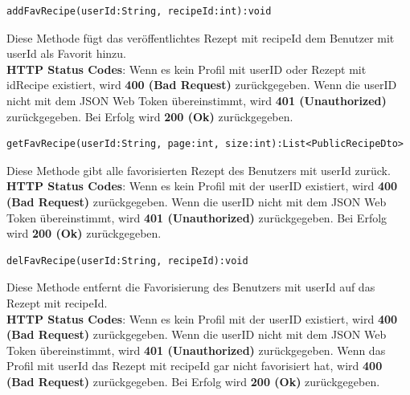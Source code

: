 \vspace{1cm}  
 \begin{lstlisting}
addFavRecipe(userId:String, recipeId:int):void
\end{lstlisting}
Diese Methode fügt das veröffentlichtes Rezept mit recipeId dem Benutzer mit userId als Favorit hinzu.\\
\textbf{HTTP Status Codes}:
Wenn es kein Profil mit userID oder Rezept mit idRecipe existiert, wird \textbf{400 (Bad Request)} zurückgegeben. Wenn die userID nicht mit dem JSON Web Token übereinstimmt, wird \textbf{401 (Unauthorized)} zurückgegeben. Bei Erfolg wird \textbf{200 (Ok)} zurückgegeben.
\vspace{1cm}
 \begin{lstlisting}
getFavRecipe(userId:String, page:int, size:int):List<PublicRecipeDto>
\end{lstlisting}
Diese Methode gibt alle favorisierten Rezept des Benutzers mit userId zurück.\\
\textbf{HTTP Status Codes}:
Wenn es kein Profil mit der userID existiert, wird \textbf{400 (Bad Request)} zurückgegeben. Wenn die userID nicht mit dem JSON Web Token übereinstimmt, wird \textbf{401 (Unauthorized)} zurückgegeben. Bei Erfolg wird \textbf{200 (Ok)} zurückgegeben.
\vspace{1cm}
 \begin{lstlisting}
delFavRecipe(userId:String, recipeId):void
\end{lstlisting}
Diese Methode entfernt die Favorisierung des Benutzers mit userId auf das Rezept mit recipeId.\\
\textbf{HTTP Status Codes}:
Wenn es kein Profil mit der userID existiert, wird \textbf{400 (Bad Request)} zurückgegeben. Wenn die userID nicht mit dem JSON Web Token übereinstimmt, wird \textbf{401 (Unauthorized)} zurückgegeben. Wenn das Profil mit userId das Rezept mit recipeId gar nicht favorisiert hat, wird \textbf{400 (Bad Request)} zurückgegeben. Bei Erfolg wird \textbf{200 (Ok)} zurückgegeben.


